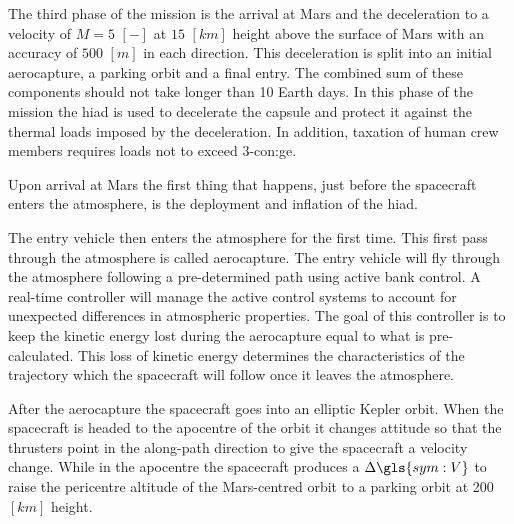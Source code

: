 The third phase of the mission is the arrival at Mars and the deceleration to a velocity of $M=5$ $\left[-\right]$ at $15$ $\left[km\right]$ height above the surface of Mars with an accuracy of $500$ $\left[m\right]$ in each direction. This deceleration is split into an initial aerocapture, a parking orbit and a final entry. The combined sum of these components should not take longer than 10 Earth days. In this phase of the mission the \gls{hiad} is used to decelerate the capsule and protect it against the thermal loads imposed by the deceleration. In addition, taxation of human crew members requires loads not to exceed 3-\gls{con:ge}.

Upon arrival at Mars the first thing that happens, just before the spacecraft enters the atmosphere, is the deployment and inflation of the \gls{hiad}. %

The entry vehicle then enters the atmosphere for the first time. This first pass through the atmosphere is called aerocapture. The entry vehicle will fly through the atmosphere following a pre-determined path using active bank control. A real-time controller will manage the active control systems to account for unexpected differences in atmospheric properties. The goal of this controller is to keep the kinetic energy lost during the aerocapture equal to what is pre-calculated. This loss of kinetic energy determines the characteristics of the trajectory which the spacecraft will follow once it leaves the atmosphere. %

After the aerocapture the spacecraft goes into an elliptic Kepler orbit. When the spacecraft is headed to the apocentre of the orbit it changes attitude so that the thrusters point in the along-path direction to give the spacecraft a velocity change. While in the apocentre the spacecraft produces a $\Delta\gls{sym:V}$ to raise the pericentre altitude of the Mars-centred orbit to a parking orbit at 200 $[km]$ height.

